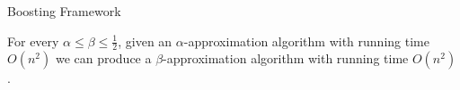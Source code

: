 \begin{frame}{Boosting Framework}
    \begin{Theorem}
        For every $\alpha \leq \beta \leq \frac{1}{2}$, given an $\alpha$-approximation 
        algorithm with running time $O(n^2)$ we can produce a $\beta$-approximation algorithm 
        with running time $O(n^2)$.
    \end{Theorem}
\end{frame}
